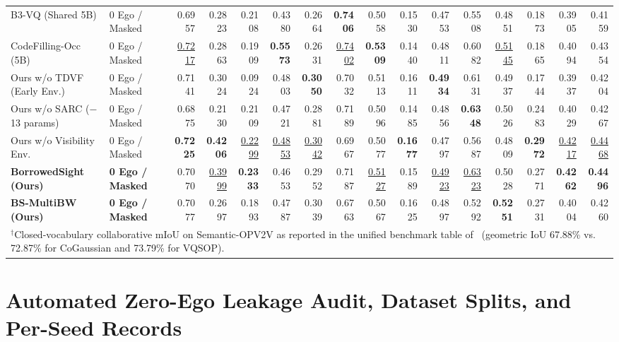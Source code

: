 \documentclass[journal]{IEEEtran}
\begin{document}
\begin{table}[!tbp]
{\begin{tabular}{llrrrrrrrrrrrrrr}
B3-VQ (Shared 5B) & 0 Ego / Masked & 0.6957 & 0.2823 & 0.2108 & 0.4380 & 0.2664 & \textbf{0.7406} & 0.5058 & 0.1530 & 0.4753 & 0.5508 & 0.4851 & 0.1873 & 0.3905 & 0.4159 \\
CodeFilling-Occ (5B) & 0 Ego / Masked & \underline{0.7217} & 0.2863 & 0.1909 & \textbf{0.5573} & 0.2631 & \underline{0.7402} & \textbf{0.5309} & 0.1440 & 0.4811 & 0.6082 & \underline{0.5145} & 0.1865 & 0.4094 & 0.4354 \\
Ours w/o TDVF (Early Env.) & 0 Ego / Masked & 0.7141 & 0.3024 & 0.0924 & 0.4803 & \textbf{0.3050} & 0.7032 & 0.5113 & 0.1611 & \textbf{0.4934} & 0.6131 & 0.4937 & 0.1744 & 0.3937 & 0.4204 \\
Ours w/o SARC ($-$13 params) & 0 Ego / Masked & 0.6875 & 0.2130 & 0.2109 & 0.4721 & 0.2881 & 0.7189 & 0.5096 & 0.1485 & 0.4856 & \textbf{0.6348} & 0.5026 & 0.2483 & 0.4029 & 0.4267 \\
Ours w/o Visibility Env. & 0 Ego / Masked & \textbf{0.7225} & \textbf{0.4206} & \underline{0.2299} & \underline{0.4853} & \underline{0.3042} & 0.6967 & 0.5077 & \textbf{0.1677} & 0.4797 & 0.5687 & 0.4809 & \textbf{0.2972} & \underline{0.4217} & \underline{0.4468} \\
\rowcolor{oursrow}
\textbf{BorrowedSight (Ours)} & \textbf{0 Ego / Masked} & 0.7070 & \underline{0.3999} & \textbf{0.2333} & 0.4653 & 0.2952 & 0.7187 & \underline{0.5127} & 0.1589 & \underline{0.4923} & \underline{0.6323} & 0.5028 & 0.2771 & \textbf{0.4262} & \textbf{0.4496} \\
\rowcolor{oursrow}
\textbf{BS-MultiBW (Ours)} & \textbf{0 Ego / Masked} & 0.7077 & 0.2697 & 0.1893 & 0.4787 & 0.3039 & 0.6763 & 0.5067 & 0.1625 & 0.4897 & 0.5292 & \textbf{0.5251} & 0.2731 & 0.4004 & 0.4260 \\
\bottomrule
\multicolumn{16}{l}{\footnotesize $^\dagger$Closed-vocabulary collaborative mIoU on Semantic-OPV2V as reported in the unified benchmark table of~\cite{verma2026cogaussian} (geometric IoU 67.88\% vs. 72.87\% for CoGaussian and 73.79\% for VQSOP).}
\end{tabular}}
\end{table}

\section{Automated Zero-Ego Leakage Audit, Dataset Splits, and Per-Seed Records}
\label{app:audit}
\end{document}
